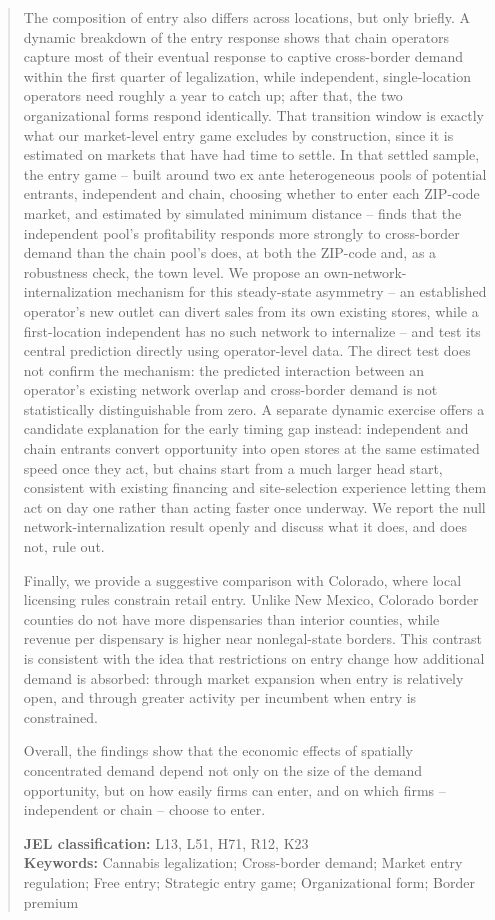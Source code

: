 \documentclass[english,12pt]{article}
\begin{document}
\begin{abstract}
The composition of entry also differs across locations, but only briefly. A dynamic breakdown of the entry response shows that chain operators capture most of their eventual response to captive cross-border demand within the first quarter of legalization, while independent, single-location operators need roughly a year to catch up; after that, the two organizational forms respond identically. That transition window is exactly what our market-level entry game excludes by construction, since it is estimated on markets that have had time to settle. In that settled sample, the entry game -- built around two ex ante heterogeneous pools of potential entrants, independent and chain, choosing whether to enter each ZIP-code market, and estimated by simulated minimum distance -- finds that the independent pool's profitability responds more strongly to cross-border demand than the chain pool's does, at both the ZIP-code and, as a robustness check, the town level. We propose an own-network-internalization mechanism for this steady-state asymmetry -- an established operator's new outlet can divert sales from its own existing stores, while a first-location independent has no such network to internalize -- and test its central prediction directly using operator-level data. The direct test does not confirm the mechanism: the predicted interaction between an operator's existing network overlap and cross-border demand is not statistically distinguishable from zero. A separate dynamic exercise offers a candidate explanation for the early timing gap instead: independent and chain entrants convert opportunity into open stores at the same estimated speed once they act, but chains start from a much larger head start, consistent with existing financing and site-selection experience letting them act on day one rather than acting faster once underway. We report the null network-internalization result openly and discuss what it does, and does not, rule out.

Finally, we provide a suggestive comparison with Colorado, where local licensing rules constrain retail entry. Unlike New Mexico, Colorado border counties do not have more dispensaries than interior counties, while revenue per dispensary is higher near nonlegal-state borders. This contrast is consistent with the idea that restrictions on entry change how additional demand is absorbed: through market expansion when entry is relatively open, and through greater activity per incumbent when entry is constrained.

Overall, the findings show that the economic effects of spatially concentrated demand depend not only on the size of the demand opportunity, but on how easily firms can enter, and on which firms -- independent or chain -- choose to enter.

\medskip
\noindent \textbf{JEL classification:} L13, L51, H71, R12, K23 \\
\noindent \textbf{Keywords:} Cannabis legalization; Cross-border demand; Market entry regulation; Free entry; Strategic entry game; Organizational form; Border premium
\end{abstract}
\end{document}
